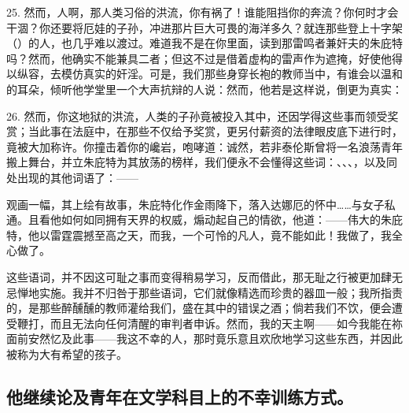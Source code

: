 25. 然而，人啊，那人类习俗的洪流，你有祸了！谁能阻挡你的奔流？你何时才会干涸？你还要将厄娃的子孙，冲进那片巨大可畏的海洋多久？就连那些登上十字架（）的人，也几乎难以渡过。难道我不是在你里面，读到那雷鸣者兼奸夫的朱庇特吗？然而，他确实不能兼具二者；但这不过是借着虚构的雷声作为遮掩，好使他得以纵容，去模仿真实的奸淫。可是，我们那些身穿长袍的教师当中，有谁会以温和的耳朵，倾听他学堂里一个大声抗辩的人说：然而，他若是这样说，倒更为真实：\par

26. 然而，你这地狱的洪流，人类的子孙竟被投入其中，还因学得这些事而领受奖赏；当此事在法庭中，在那些不仅给予奖赏，更另付薪资的法律眼皮底下进行时，竟被大加称许。你撞击着你的巉岩，咆哮道：诚然，若非泰伦斯曾将一名浪荡青年搬上舞台，并立朱庇特为其放荡的榜样，我们便永不会懂得这些词：、、、，以及同处出现的其他词语了：——\par

观画一幅，其上绘有故事，\newline{}朱庇特化作金雨降下，\newline{}落入达娜厄的怀中……与女子私通。\newline{}且看他如何如同拥有天界的权威，煽动起自己的情欲，他道：——\newline{}伟大的朱庇特，\newline{}他以雷霆震撼至高之天，\newline{}而我，一个可怜的凡人，竟不能如此！\newline{}我做了，我全心做了。\par

这些语词，并不因这可耻之事而变得稍易学习，反而借此，那无耻之行被更加肆无忌惮地实施。我并不归咎于那些语词，它们就像精选而珍贵的器皿一般；我所指责的，是那些醉醺醺的教师灌给我们，盛在其中的错误之酒；倘若我们不饮，便会遭受鞭打，而且无法向任何清醒的审判者申诉。然而，我的天主啊——如今我能在祢面前安然忆及此事——我这不幸的人，那时竟乐意且欢欣地学习这些东西，并因此被称为大有希望的孩子。\par


\subsection{他继续论及青年在文学科目上的不幸训练方式。}

